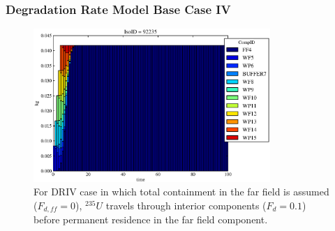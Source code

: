 %
%
%
%
%
\begin{frame}[ctb!]
  \frametitle{Degradation Rate Model Base Case IV}

\begin{figure}[ht]
\centering
\includegraphics[width=0.8\textwidth]{./images/drIV.eps}
\caption[$^{235}U$ residence. Degradation Rate Buffer No Release.]{
For DRIV case in which total containment in the far field is assumed ($F_{d,ff}=0$), 
$^{235}U$ travels through interior components ($F_d = 0.1$) before 
permanent residence in the far field component.
}
\label{fig:drIVall}
\end{figure}
\end{frame}

